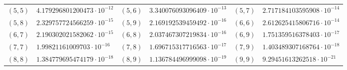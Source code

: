 {\begin{longtable}{rlrlrl}
$(5,5)$ & $4.179296801200473\cdot10^{-12}$ & $(5,6)$ & $3.340076093096409\cdot10^{-13}$ & $(5,7)$ & $2.717184103595908\cdot10^{-14}$\\
$(5,8)$ & $2.329757724566259\cdot10^{-15}$ & $(5,9)$ & $2.169192539459492\cdot10^{-16}$ & $(6,6)$ & $2.612625415806716\cdot10^{-14}$\\
$(6,7)$ & $2.190302021582062\cdot10^{-15}$ & $(6,8)$ & $2.037467307219834\cdot10^{-16}$ & $(6,9)$ & $1.751359516378403\cdot10^{-17}$\\
$(7,7)$ & $1.99821161009703\cdot10^{-16}$ & $(7,8)$ & $1.696715317716563\cdot10^{-17}$ & $(7,9)$ & $1.403489307168764\cdot10^{-18}$\\
$(8,8)$ & $1.384779695474179\cdot10^{-18}$ & $(8,9)$ & $1.136784496999098\cdot10^{-19}$ & $(9,9)$ & $9.29451613262518\cdot10^{-21}$\\
\bottomrule
\end{longtable}}


